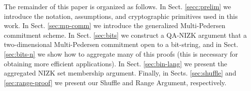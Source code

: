 The remainder of this paper is organized as follows. In Sect. \ref{secc:prelim} we introduce the notation, assumptions, and cryptographic primitives used in this work. In Sect. \ref{sec:mp-comm} we introduce the generalized Multi-Pedersen commitment scheme.
In Sect. \ref{sec:bits} we construct a QA-NIZK argument that a two-dimensional Multi-Pedersen commitment open to a bit-string, and in Sect. \ref{sec:bits-n} we show how to aggregate many of this proofs (this is necessary for obtaining more efficient applications).
In Sect. \ref{sec:bin-lang} we present the aggregated NIZK set membership argument. Finally, in Sects. \ref{sec:shuffle} and \ref{sec:range-proof} we present our Shuffle and Range Argument, respectively.
